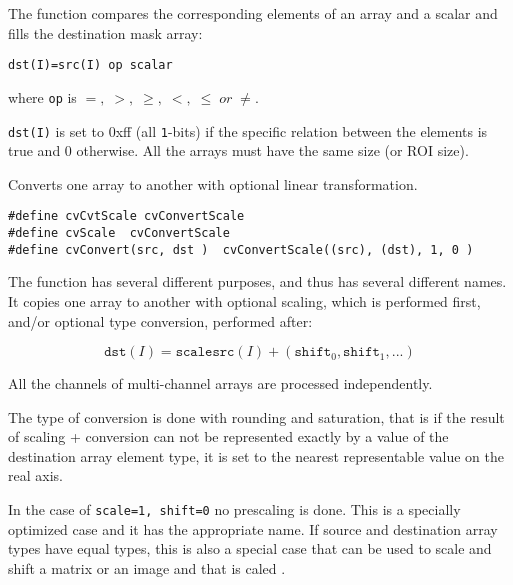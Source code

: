 The function compares the corresponding elements of an array and a scalar and fills the destination mask array:

\begin{lstlisting}
dst(I)=src(I) op scalar
\end{lstlisting}

where \texttt{op} is $=,\; >,\; \ge,\; <,\; \le\; or\; \ne$.

\texttt{dst(I)} is set to 0xff (all \texttt{1}-bits) if the specific relation between the elements is true and 0 otherwise. All the arrays must have the same size (or ROI size).

Converts one array to another with optional linear transformation.


\begin{lstlisting}
#define cvCvtScale cvConvertScale
#define cvScale  cvConvertScale
#define cvConvert(src, dst )  cvConvertScale((src), (dst), 1, 0 )
\end{lstlisting}

\begin{description}
\end{description}


The function has several different purposes, and thus has several different names. It copies one array to another with optional scaling, which is performed first, and/or optional type conversion, performed after:

\[
\texttt{dst}(I) = \texttt{scale} \texttt{src}(I) + (\texttt{shift}_0,\texttt{shift}_1,...)
\]

All the channels of multi-channel arrays are processed independently.

The type of conversion is done with rounding and saturation, that is if the
result of scaling + conversion can not be represented exactly by a value
of the destination array element type, it is set to the nearest representable
value on the real axis.

In the case of \texttt{scale=1, shift=0} no prescaling is done. This is a specially
optimized case and it has the appropriate  name. If
source and destination array types have equal types, this is also a
special case that can be used to scale and shift a matrix or an image
and that is caled .


